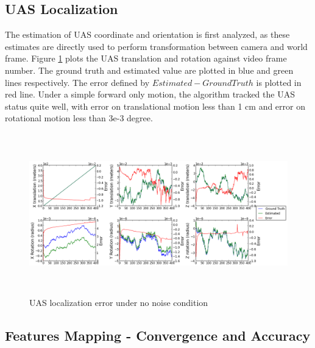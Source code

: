 \subsection{UAS Localization}
The estimation of UAS coordinate and orientation is first analyzed, as 
these estimates are directly used to perform transformation between 
camera and world frame. Figure \ref{fig:simfig1} plots the UAS 
translation and rotation against video frame number. The ground truth 
and estimated value are plotted in blue and green lines respectively. 
The error defined by $Estimated-Ground Truth$ is plotted in red line. 
Under a simple forward only motion, the algorithm tracked the UAS status 
quite well, with error on translational motion less than 1 cm and error 
on rotational motion less than 3e-3 degree. 

\begin{figure}[h]
\centering
\includegraphics[width=15cm, height=7cm]{./Figures/SimulationFigures/Figure1.png}
\caption{UAS localization error under no noise condition}
\label{fig:simfig1}
\end{figure}


\subsection{Features Mapping - Convergence and Accuracy}

